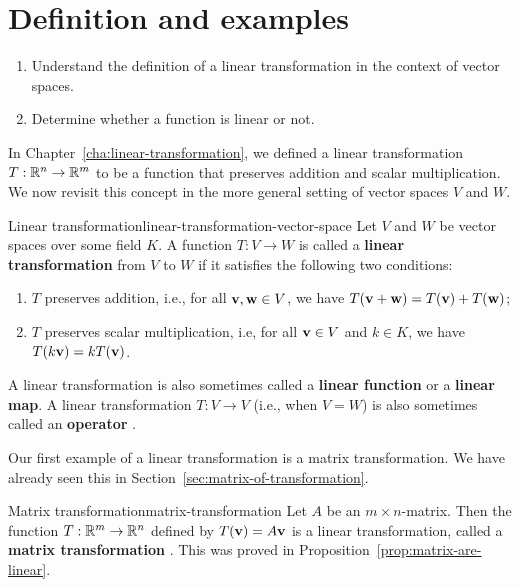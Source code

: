 \section{Definition and examples}

\begin{outcome}
  \begin{enumerate}
  \item Understand the definition of a linear transformation in the
    context of vector spaces.
  \item Determine whether a function is linear or not.
  \end{enumerate}
\end{outcome}

In Chapter~\ref{cha:linear-transformation}, we defined a linear
transformation $T:\mathbb{R}^n\to\mathbb{R}^m$ to be a function that preserves
addition and scalar multiplication. We now revisit this concept in the
more general setting of vector spaces $V$ and $W$.

\begin{definition}{Linear transformation}{linear-transformation-vector-space}
  Let $V$ and $W$ be vector spaces over some field $K$. A function
  $T: V \to W$ is called a \textbf{linear transformation}%
   from $V$ to $W$ if
  it satisfies the following two conditions:
  \begin{enumerate}
  \item $T$ preserves addition, i.e., for all\/
    $\vect{v},\vect{w}\in V$, we have
    $T(\vect{v}+\vect{w}) = T(\vect{v}) + T(\vect{w})$;
  \item $T$ preserves scalar multiplication, i.e, for all\/
    $\vect{v}\in V$ and $k\in K$, we have
    $T(k\vect{v}) = kT(\vect{v})$.
  \end{enumerate}
  A linear transformation is also sometimes called a \textbf{linear
    function} or a \textbf{linear map}. A linear transformation
  $T:V\to V$ (i.e., when $V=W$) is also sometimes called an
  \textbf{operator}%
  .
\end{definition}

Our first example of a linear transformation is a matrix
transformation. We have already seen this in
Section~\ref{sec:matrix-of-transformation}.

\begin{example}{Matrix transformation}{matrix-transformation}
  Let $A$ be an $m\times n$-matrix. Then the function $T:\mathbb{R}^m\to\mathbb{R}^n$
  defined by $T(\vect{v})=A\vect{v}$ is a linear transformation,
  called a \textbf{matrix transformation}%
  . This was proved in
  Proposition~\ref{prop:matrix-are-linear}.
\end{example}

